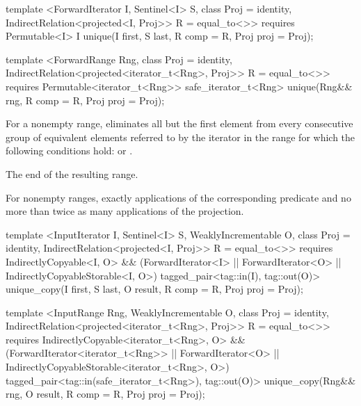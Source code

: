 %
\begin{itemdecl}
template <ForwardIterator I, Sentinel<I> S, class Proj = identity,
    IndirectRelation<projected<I, Proj>> R = equal_to<>>
  requires Permutable<I>
  I unique(I first, S last, R comp = R{}, Proj proj = Proj{});

template <ForwardRange Rng, class Proj = identity,
    IndirectRelation<projected<iterator_t<Rng>, Proj>> R = equal_to<>>
  requires Permutable<iterator_t<Rng>>
  safe_iterator_t<Rng>
    unique(Rng&& rng, R comp = R{}, Proj proj = Proj{});
\end{itemdecl}

\begin{itemdescr}
\pnum
\effects
For a nonempty range, eliminates all but the first element from every
consecutive group of equivalent elements referred to by the iterator
in the range
for which the following conditions hold:
or
.

\pnum
\returns
The end of the resulting range.

\pnum
\complexity
For nonempty ranges, exactly
applications of the corresponding predicate and no more than twice as many
applications of the projection.
\end{itemdescr}

%
\begin{itemdecl}
template <InputIterator I, Sentinel<I> S, WeaklyIncrementable O,
    class Proj = identity, IndirectRelation<projected<I, Proj>> R = equal_to<>>
  requires IndirectlyCopyable<I, O> && (ForwardIterator<I> ||
    ForwardIterator<O> || IndirectlyCopyableStorable<I, O>)
  tagged_pair<tag::in(I), tag::out(O)>
    unique_copy(I first, S last, O result, R comp = R{}, Proj proj = Proj{});

template <InputRange Rng, WeaklyIncrementable O, class Proj = identity,
    IndirectRelation<projected<iterator_t<Rng>, Proj>> R = equal_to<>>
  requires IndirectlyCopyable<iterator_t<Rng>, O> &&
    (ForwardIterator<iterator_t<Rng>> || ForwardIterator<O> ||
     IndirectlyCopyableStorable<iterator_t<Rng>, O>)
  tagged_pair<tag::in(safe_iterator_t<Rng>), tag::out(O)>
    unique_copy(Rng&& rng, O result, R comp = R{}, Proj proj = Proj{});
\end{itemdecl}

